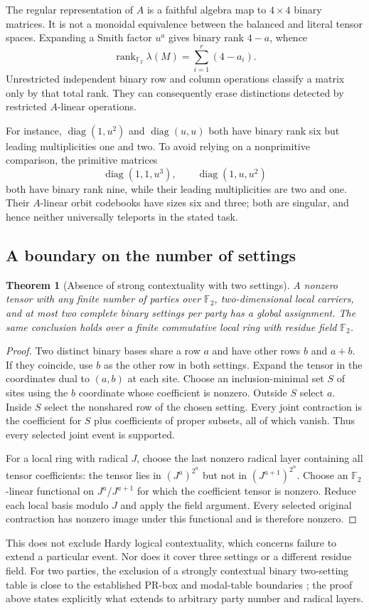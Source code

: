 \documentclass[11pt]{article}
\newtheorem{theorem}{Theorem}[section]
\theoremstyle{definition}\newtheorem{definition}[theorem]{Definition}
\theoremstyle{remark}\newtheorem{remark}[theorem]{Remark}
\newcommand{\F}{\mathbb F}
\DeclareMathOperator{\rank}{rank}
\DeclareMathOperator{\diag}{diag}
\begin{document}
The regular representation of $A$ is a faithful algebra map to $4\times4$ binary matrices. It is not a monoidal equivalence between the balanced and literal tensor spaces. Expanding a Smith factor $u^a$ gives binary rank $4-a$, whence
\[
 \rank_{\F_2}\lambda(M)=\sum_{i=1}^r(4-a_i).
\]
Unrestricted independent binary row and column operations classify a matrix only by that total rank. They can consequently erase distinctions detected by restricted $A$-linear operations.

For instance, $\diag(1,u^2)$ and $\diag(u,u)$ both have binary rank six but leading multiplicities one and two. To avoid relying on a nonprimitive comparison, the primitive matrices
\[
 \diag(1,1,u^3),\qquad \diag(1,u,u^2)
\]
both have binary rank nine, while their leading multiplicities are two and one. Their $A$-linear orbit codebooks have sizes six and three; both are singular, and hence neither universally teleports in the stated task.

\subsection{A boundary on the number of settings}
\begin{theorem}[Absence of strong contextuality with two settings]\label{thm:two}
A nonzero tensor with any finite number of parties over $\F_2$, two-dimensional local carriers, and at most two complete binary settings per party has a global assignment. The same conclusion holds over a finite commutative local ring with residue field $\F_2$.
\end{theorem}
\begin{proof}
Two distinct binary bases share a row $a$ and have other rows $b$ and $a+b$. If they coincide, use $b$ as the other row in both settings. Expand the tensor in the coordinates dual to $(a,b)$ at each site. Choose an inclusion-minimal set $S$ of sites using the $b$ coordinate whose coefficient is nonzero. Outside $S$ select $a$. Inside $S$ select the nonshared row of the chosen setting. Every joint contraction is the coefficient for $S$ plus coefficients of proper subsets, all of which vanish. Thus every selected joint event is supported.

For a local ring with radical $J$, choose the last nonzero radical layer containing all tensor coefficients: the tensor lies in $(J^a)^{2^n}$ but not in $(J^{a+1})^{2^n}$. Choose an $\F_2$-linear functional on $J^a/J^{a+1}$ for which the coefficient tensor is nonzero. Reduce each local basis modulo $J$ and apply the field argument. Every selected original contraction has nonzero image under this functional and is therefore nonzero.
\end{proof}
This does not exclude Hardy logical contextuality, which concerns failure to extend a particular event. Nor does it cover three settings or a different residue field. For two parties, the exclusion of a strongly contextual binary two-setting table is close to the established PR-box and modal-table boundaries \cite{AbramskyBrandenburger2011,Schumacher2012}; the proof above states explicitly what extends to arbitrary party number and radical layers.
\end{document}
